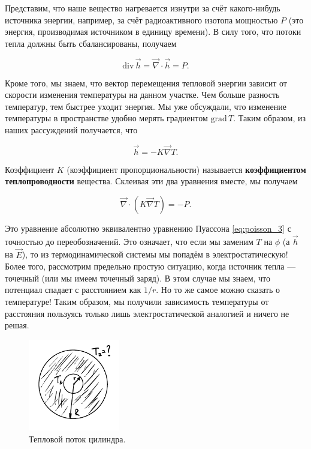 \documentclass[12pt,a4paper]{article}
\numberwithin{equation}{section}
\numberwithin{equation}{section}
\newcommand{\grad}{\mathrm{grad}\,}
\renewcommand{\div}{\mathrm{div}\,}
\newcommand{\vn}{\vec{\nabla}}
\begin{document}
Представим, что наше вещество нагревается изнутри за счёт
какого-нибудь источника энергии, например, за счёт радиоактивного
изотопа мощностью $P$ (это энергия, производимая источником в единицу
времени). В силу того, что потоки тепла должны быть сбалансированы,
получаем 

\begin{equation}
  \label{eq:heat_1}
  \div \vec{h} = \vn \cdot \vec{h} = P.
\end{equation}

Кроме того, мы знаем, что вектор перемещения тепловой энергии зависит
от скорости изменения температуры на данном участке. Чем больше
разность температур, тем быстрее уходит энергия. Мы уже обсуждали, что
изменение температуры в пространстве удобно мерять градиентом $\grad
T$. Таким образом, из наших рассуждений получается, что 

\begin{equation}
  \label{eq:heat_2}
  \vec{h} = - K \vn T. 
\end{equation}

Коэффициент $K$ (коэффициент пропорциональности) называется
\textbf{коэффициентом теплопроводности} вещества. Склеивая эти два
уравнения вместе, мы получаем 

\begin{equation}
  \label{eq:heat_3}
  \vn \cdot (K \vn T) = -P.
\end{equation}

Это уравнение абсолютно эквивалентно уравнению Пуассона
\eqref{eq:poisson_3} с точностью до переобозначений. Это означает, что
если мы заменим $T$ на $\phi$ (а $\vec{h}$ на $\vec{E}$), то из
термодинамической системы мы попадём в электростатическую! Более того,
рассмотрим предельно простую ситуацию, когда источник тепла ---
точечный (или мы имеем точечный заряд). В этом случае мы знаем, что
потенциал спадает с расстоянием как $1/r$. Но то же самое можно
сказать о температуре! Таким образом, мы получили зависимость
температуры от расстояния пользуясь только лишь электростатической
аналогией и ничего не решая.


\begin{figure}
  \vspace{-1.2cm}
  \begin{center}
    \includegraphics[width=4cm,height=4cm]{heat.pdf}
  \end{center}
  \vspace{-0.7cm}
  \caption{Тепловой поток цилиндра.}
  \label{fig:heat}
\end{figure}
\end{document}
